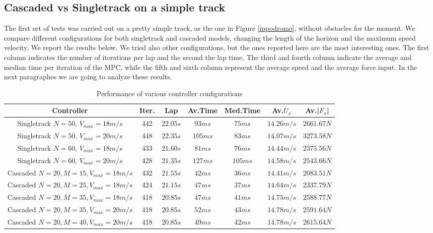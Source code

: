 \documentclass[a4paper, onecolumn, 12pt]{article}
\begin{document}
\subsection{Cascaded vs Singletrack on a simple track}
The first set of tests was carried out on a pretty simple track, as the one in
Figure \ref{ippodromo}, without obstacles for the moment. We compare different
configurations for both singletrack and cascaded models, changing the length of
the horizon and the maximum speed velocity. We report the results below. We
tried also other configurations, but the ones reported here are the most
interesting ones. The first column indicates the number of iterations per lap
and the second the lap time. The third and fourth column indicate the average
and median time per iteration of the MPC, while the fifth and sixth column
represent the average speed and the average force input. In the next paragraphes
we are going to analyze these results. 
\begin{table}[h] 
    \centering
    \caption{Performance of various controller configurations} \label{simulations}
    \hspace*{-2.66cm}
    \begin{tabular}{|c||c|c|c|c|c|c|}
        \hline
        \textbf{Controller} & \textbf{Iter.} & \textbf{Lap} & \textbf{Av.Time} & \textbf{Med.Time} & \textbf{Av.$U_x$} & \textbf{Av.|$F_x$|} \\ [0.5ex] 
        \hline
        \hline
        Singletrack $N=50$, $V_{max}=18m/s$ & 442 & $22.05 s$ & $93 ms$ & $75 ms$ & $14.26 m/s$ & $2661.67 N$\\
        \hline
        Singletrack $N=50$, $V_{max}=20m/s$ & 448 & $22.35 s$ & $105 ms$ & $83 ms$ & $14.07 m/s$ & $3273.58 N$\\
        \hline
        Singletrack $N=60$, $V_{max}=18m/s$ & 433 & $21.60 s$ & $81 ms$ & $76 ms$ & $14.44 m/s$ & $2375.56 N$\\
        \hline
        Singletrack $N=60$, $V_{max}=20m/s$ & 428 & $21.35 s$ & $127 ms$ & $105 ms$ & $14.58 m/s$ & $2543.66 N$\\
        \hline
        Cascaded $N=20, M=15, V_{max}=18m/s$ & 432 & $21.55 s$ & $42 ms$ & $36 ms$ & $14.41 m/s$ & $2083.51 N$\\
        \hline
        Cascaded $N=20, M=25, V_{max}=18m/s$ & 424 & $21.15 s$ & $47 ms$ & $37 ms$ & $14.64 m/s$ & $2337.79 N$\\
        \hline
        Cascaded $N=20, M=35, V_{max}=18m/s$ & 418 & $20.85 s$ & $47 ms$ & $41 ms$ & $14.75 m/s$ & $2588.77 N$\\
        \hline
        Cascaded $N=20, M=35, V_{max}=20m/s$ & 418 & $20.85 s$ & $52 ms$ & $43 ms$ & $14.78 m/s$ & $2591.64 N$\\
        \hline
        Cascaded $N=20, M=40, V_{max}=20m/s$ & 418 & $20.85 s$ & $49 ms$ & $42 ms$ & $14.78 m/s$ & $2615.64 N$\\
        \hline
    \end{tabular}
    \label{experiments}
\end{table}
\end{document}
